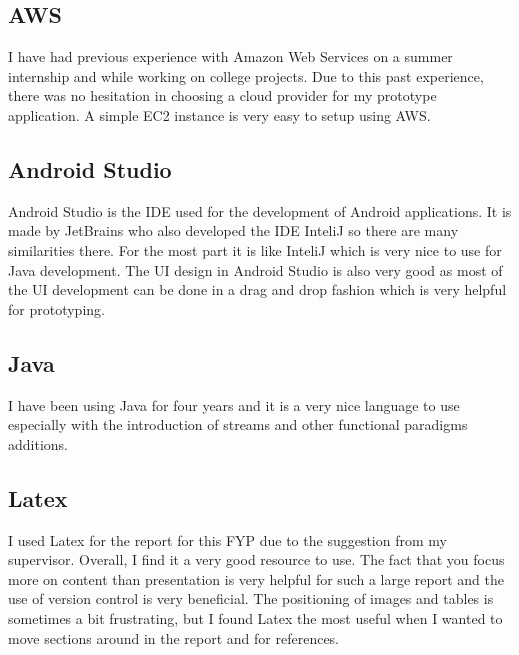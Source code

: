 \tocless\subsection{AWS}
I have had previous experience with Amazon Web Services on a summer internship and while working on college projects.
Due to this past experience, there was no hesitation in choosing a cloud provider for my prototype application.
A simple EC2 instance is very easy to setup using AWS.

\tocless\subsection{Android Studio}
Android Studio is the IDE used for the development of Android applications.
It is made by JetBrains who also developed the IDE InteliJ so there are many similarities there.
For the most part it is like InteliJ which is very nice to use for Java development.
The UI design in Android Studio is also very good as most of the UI development can be done in a drag and drop fashion which is very helpful for prototyping.

\tocless\subsection{Java}
I have been using Java for four years and it is a very nice language to use especially with the introduction of streams and other functional paradigms additions.

\tocless\subsection{Latex}
I used Latex for the report for this FYP due to the suggestion from my supervisor.
Overall, I find it a very good resource to use.
The fact that you focus more on content than presentation is very helpful for such a large report and the use of version control is very beneficial.
The positioning of images and tables is sometimes a bit frustrating, but I found Latex the most useful when I wanted to move sections around in the report and for references.